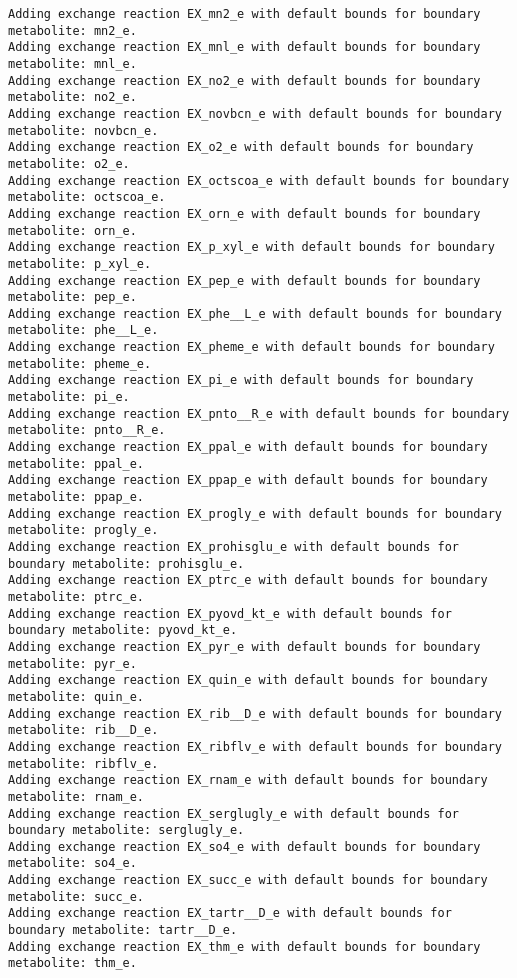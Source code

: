 \documentclass[
  letterpaper,
  DIV=11,
  numbers=noendperiod]{scrartcl}
\begin{document}
\begin{verbatim}
Adding exchange reaction EX_mn2_e with default bounds for boundary metabolite: mn2_e.
Adding exchange reaction EX_mnl_e with default bounds for boundary metabolite: mnl_e.
Adding exchange reaction EX_no2_e with default bounds for boundary metabolite: no2_e.
Adding exchange reaction EX_novbcn_e with default bounds for boundary metabolite: novbcn_e.
Adding exchange reaction EX_o2_e with default bounds for boundary metabolite: o2_e.
Adding exchange reaction EX_octscoa_e with default bounds for boundary metabolite: octscoa_e.
Adding exchange reaction EX_orn_e with default bounds for boundary metabolite: orn_e.
Adding exchange reaction EX_p_xyl_e with default bounds for boundary metabolite: p_xyl_e.
Adding exchange reaction EX_pep_e with default bounds for boundary metabolite: pep_e.
Adding exchange reaction EX_phe__L_e with default bounds for boundary metabolite: phe__L_e.
Adding exchange reaction EX_pheme_e with default bounds for boundary metabolite: pheme_e.
Adding exchange reaction EX_pi_e with default bounds for boundary metabolite: pi_e.
Adding exchange reaction EX_pnto__R_e with default bounds for boundary metabolite: pnto__R_e.
Adding exchange reaction EX_ppal_e with default bounds for boundary metabolite: ppal_e.
Adding exchange reaction EX_ppap_e with default bounds for boundary metabolite: ppap_e.
Adding exchange reaction EX_progly_e with default bounds for boundary metabolite: progly_e.
Adding exchange reaction EX_prohisglu_e with default bounds for boundary metabolite: prohisglu_e.
Adding exchange reaction EX_ptrc_e with default bounds for boundary metabolite: ptrc_e.
Adding exchange reaction EX_pyovd_kt_e with default bounds for boundary metabolite: pyovd_kt_e.
Adding exchange reaction EX_pyr_e with default bounds for boundary metabolite: pyr_e.
Adding exchange reaction EX_quin_e with default bounds for boundary metabolite: quin_e.
Adding exchange reaction EX_rib__D_e with default bounds for boundary metabolite: rib__D_e.
Adding exchange reaction EX_ribflv_e with default bounds for boundary metabolite: ribflv_e.
Adding exchange reaction EX_rnam_e with default bounds for boundary metabolite: rnam_e.
Adding exchange reaction EX_serglugly_e with default bounds for boundary metabolite: serglugly_e.
Adding exchange reaction EX_so4_e with default bounds for boundary metabolite: so4_e.
Adding exchange reaction EX_succ_e with default bounds for boundary metabolite: succ_e.
Adding exchange reaction EX_tartr__D_e with default bounds for boundary metabolite: tartr__D_e.
Adding exchange reaction EX_thm_e with default bounds for boundary metabolite: thm_e.

\end{verbatim}
\end{document}
